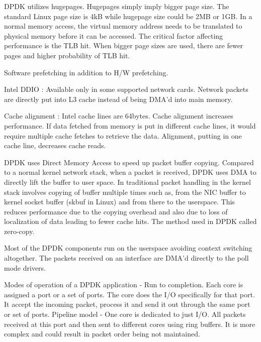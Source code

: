 \documentclass[english, 12pt, a4paper, elec, utf8, a-1b, online]{aaltothesis}
\begin{document}
DPDK utilizes hugepages. Hugepages simply imply bigger page size. The standard Linux page size is 4kB while hugepage size could be 2MB or 1GB. In a normal memory access, the virtual memory address needs to be translated to physical memory before it can be accessed. The critical factor affecting performance is the TLB hit. When bigger page sizes are used, there are fewer pages and higher probability of TLB hit.

Software prefetching in addition to H/W prefetching. 

Intel DDIO : Available only in some supported network cards. Network packets are directly put into L3 cache instead of being DMA'd into main memory.

Cache alignment : Intel cache lines are 64bytes. Cache alignment increases performance. If data fetched from memory is put in different cache lines, it would require multiple cache fetches to retrieve the data. Alignment, putting in one cache line, decreases cache reads.

DPDK uses Direct Memory Access to speed up packet buffer copying. Compared to a normal kernel network
stack, when a packet is received, DPDK uses DMA to directly lift the buffer to user space. In traditional packet handling in the kernel stack involves copying of buffer multiple times such as, from the NIC buffer to kernel socket buffer (skbuf in Linux) and from there to the userspace. This reduces performance due to the copying overhead and also due to loss of localization of data leading to fewer cache hits. The method used in DPDK called zero-copy.

Most of the DPDK components run on the userspace avoiding context switching altogether. The packets received on an interface are DMA'd directly to the poll mode drivers. 

Modes of operation of a DPDK application - Run to completion. Each core is assigned a port or a set of ports. The core does the I/O specifically for that port. It accept the incoming packet, process it and send it out through the same port or set of ports. Pipeline model - One core is dedicated to just I/O. All packets received at this port and then sent to different cores using ring buffers. It is more complex and could result in packet order being not maintained.

\end{document}
